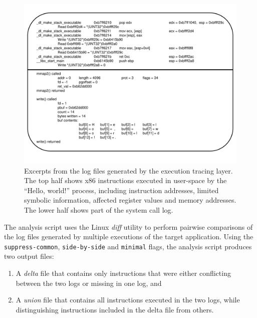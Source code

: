 \begin{figure}[h]
  \center
  \includegraphics[scale=0.50, trim=2cm 2cm 2cm 0.5cm]{log.pdf}
  \caption[Excerpts from the log files generated by the execution tracing layer]%
          {Excerpts from the log files generated by the execution tracing layer.
          The top half shows x86 instructions executed 
          in user-space by the ``Hello, world!'' process, including instruction addresses, 
          limited symbolic information, affected register values and memory 
          addresses. The lower half shows part of the system call log.}
  \label{hw:logsys}
\end{figure}

 \newline
The analysis script uses the Linux \emph{diff} utility
to perform pairwise comparisons of the log files generated 
by multiple executions of the target application. 
Using the \texttt{suppress-common}, \texttt{side-by-side}
and \texttt{minimal} flags, the analysis script
produces two output files: 
\begin{enumerate}
\item A {\em delta} file
that contains only instructions that were 
either conflicting between the two logs or missing in one log, and
\item A {\em union} file that contains all instructions
executed in the two logs, while distinguishing instructions  
included in the delta file from others.
\end{enumerate}


